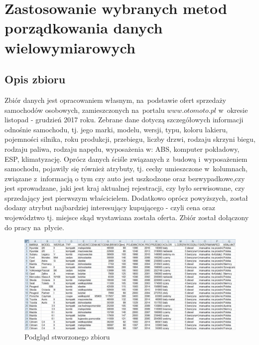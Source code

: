 \documentclass[12pt,a4paper]{report}
\begin{document}
\chapter{Zastosowanie wybranych metod porządkowania danych wielowymiarowych}\label{Zastosowanie}



\section{Opis zbioru}

Zbiór danych jest opracowaniem własnym, na~podstawie ofert sprzedaży samochodów osobowych, zamieszczonych na~portalu $www.otomoto.pl$ w~okresie listopad - grudzień 2017 roku. Zebrane dane dotyczą szczegółowych informacji odnośnie samochodu, tj. jego marki, modelu, wersji, typu, koloru lakieru, pojemności silnika, roku produkcji, przebiegu, liczby drzwi, rodzaju skrzyni biegu, rodzaju paliwa, rodzaju napędu, wyposażenia w: ABS, komputer pokładowy, ESP, klimatyzację. Oprócz danych ściśle związanych z~budową i~wyposażeniem samochodu, pojawiły się również atrybuty, tj. cechy umieszczone w~kolumnach, związane z~informacją o tym czy auto jest uszkodzone oraz bezwypadkowe,czy jest sprowadzane, jaki jest kraj aktualnej rejestracji, czy było serwisowane, czy sprzedający jest pierwszym właścicielem. Dodatkowo oprócz powyższych, został dodany atrybut najbardziej interesujący kupującego - czyli cena oraz województwo tj. miejsce skąd wystawiana została oferta. Zbiór został dołączony do pracy na~płycie. 
\begin{figure}[h]
\centering
\includegraphics[width=1\textwidth]{img/zbior3.jpg}
\caption{Podgląd stworzonego zbioru}
\label{fig:obrazek1}
\end{figure}
\end{document}
